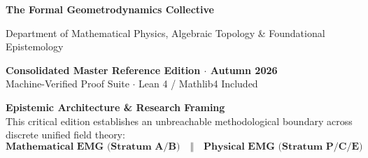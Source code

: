 \documentclass[
    12pt,
    a4paper,
    headings=normal,
    twoside=false,
    open=any,
    parskip=half
]{scrbook}
\begin{document}
\begin{titlepage}
\begin{center}
    \vfill

    {\Large\sffamily\bfseries\color{maincolor} The Formal Geometrodynamics Collective}
    \vspace{0.35cm}\par
    {\small\sffamily\color{darkslate} 
    Department of Mathematical Physics, Algebraic Topology \& Foundational Epistemology}
    \vspace{1.0cm}\par

    \begin{tcolorbox}[
        enhanced,
        width=0.72\textwidth,
        colback=boxbgcolor,
        colframe=boxframecolor!60,
        arc=2mm,
        boxrule=0.6pt,
        halign=center,
        top=4pt, bottom=4pt
    ]
        {\footnotesize\sffamily\bfseries\color{maincolor} 
        Consolidated Master Reference Edition $\cdot$ Autumn 2026}\\[1pt]
        {\tiny\sffamily\color{mediumgray} 
        Machine-Verified Proof Suite $\cdot$ Lean 4 / Mathlib4 Included}
    \end{tcolorbox}
\end{center}
\vspace*{0.2cm}
\end{titlepage}

\clearpage
\thispagestyle{empty}

\noindent\textbf{\sffamily\color{maincolor}\Large Epistemic Architecture \& Research Framing}\\[0.8em]
\noindent This critical edition establishes an unbreachable methodological boundary across discrete unified field theory:
\begin{equation*}
\boxed{\textbf{Mathematical EMG (Stratum A/B)} \quad \Big\Vert \quad \textbf{Physical EMG (Stratum P/C/E)}}
\end{equation*}
\end{document}
